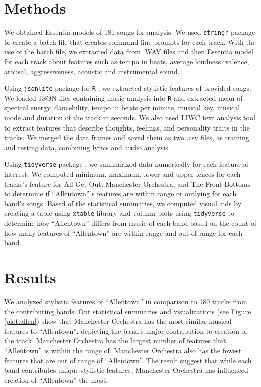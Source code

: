 \documentclass{article}\usepackage[]{graphicx}\usepackage[]{xcolor}
\begin{document}
\begin{multicols}{2}
\section{Methods}
We obtained Essentia models \citep{alonso2020tensorflow} of 181 songs for analysis. We used \texttt{stringr} package \citep{stringr} to create a batch file that creates command line prompts for each track. With the use of the batch file, we extracted data from .WAV files and then Essentia model for each track about features such as tempo in beats, average loudness, valence, arousal, aggressiveness, acoustic and instrumental sound. 

Using \texttt{jsonlite} package for \texttt{R} \citep{jsonlite}, we extracted stylistic features of provided songs. We loaded JSON files containing music analysis into \texttt{R} and extracted mean of spectral energy, dancebility, tempo in beats per minute, musical key, musical mode and duration of the track in seconds. We also used LIWC text analysis tool \citep{boyd2022development} to extract features that describe thoughts, feelings, and personality traits in the tracks. We merged the data frames and saved them as two .csv files, as training and testing data, combining lyrics and audio analysis. 

Using \texttt{tidyverse} package \citep{tidyverse}, we summarized data numerically for each feature of interest. We computed minimum, maximum, lower and upper fences for each tracks's feature for All Get Out, Manchester Orchestra, and The Front Bottoms to determine if ``Allentown'''s features are within range or outlying for each band's songs. Based of the statistical summaries, we computed visual aids by creating a table using \texttt{xtable} library \citep{xtable} and column plots using \texttt{tidyverse} to determine how ``Allentown'' differs from music of each band based on the count of how many features of ``Allentown'' are within range and out of range for each band.


\section{Results}
We analyzed stylistic features of ``Allentown'' in comparison to 180 tracks from the contributing bands. Out statistical summaries and visualizations (see Figure \ref{plot.allen}) show that Manchester Orchestra has the most similar musical features to ``Allentown'', depicting the band's major contribution to creation of the track. Manchester Orchestra has the largest number of features that ``Allentown'' is within the range of. Manchester Orchestra also has the fewest features that are out of range of ``Allentown''. The result suggest that while each band contributes unique stylistic features, Manchester Orchestra has influenced creation of ``Allentown'' the most.


\end{multicols}
\end{document}
